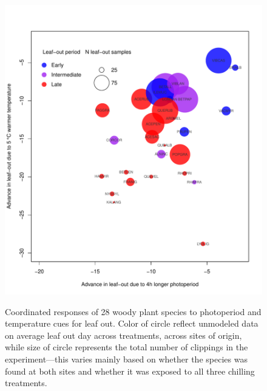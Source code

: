 \documentclass{article}
\begin{document}

\clearpage 


\begin{figure} 
\begin{center}
\caption{Coordinated responses of 28 woody plant species to photoperiod and temperature cues for leaf out. Color of circle reflect unmodeled data on average leaf out day across treatments, across sites of origin, while size of circle represents the total number of clippings in the experiment---this varies mainly based on whether the species was found at both sites and whether it was exposed to all three chilling treatments. } %
\includegraphics[scale=0.5]{Advplot2}
\label{fig1}
\end{center}
\end{figure}
\end{document}
